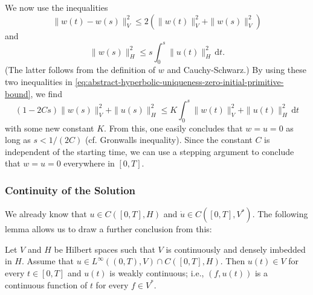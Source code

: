 We now use the inequalities
\begin{equation}\label{eq:abstract-hyperbolic-primitive-difference-triangle-bound}
\|w(t)-w(s)\|_V^2\leq2(\|w(t)\|_V^2+\|w(s)\|_V^2)
\end{equation}
and
\begin{equation}\label{eq:abstract-hyperbolic-primitive-cauchy-schwarz-bound}
\|w(s)\|_H^2\leq s\int_0^s\|u(t)\|_H^2\,\mathrm{d}t.
\end{equation}
(The latter follows from the definition of $w$ and Cauchy-Schwarz.) By using these two inequalities in \eqref{eq:abstract-hyperbolic-uniqueness-zero-initial-primitive-bound}, we find
\begin{equation}\label{eq:abstract-hyperbolic-uniqueness-stepping-gronwall-bound}
(1-2Cs)\|w(s)\|_V^2+\|u(s)\|_H^2\leq K\int_0^s\|w(t)\|_V^2+\|u(t)\|_H^2\,\mathrm{d}t
\end{equation}
with some new constant $K$. From this, one easily concludes that $w=u=0$ as long as $s<1/(2C)$ (cf. Gronwall\textquotesingle s inequality). Since the constant $C$ is independent of the starting time, we can use a stepping argument to conclude that $w=u=0$ everywhere in $[0,T]$.

\subsubsection{Continuity of the Solution}\label{subsec:hyperbolic-solution-continuity}

We already know that $u\in C([0,T],H)$ and $\dot u\in C([0,T],V^*)$. The following lemma allows us to draw a further conclusion from this:

\begin{Lemma}
\label{lem:hilbert-triple-weak-continuity}
Let $V$ and $H$ be Hilbert spaces such that $V$ is continuously and densely imbedded in $H$. Assume that $u\in L^\infty((0,T),V)\cap C([0,T],H)$. Then $u(t)\in V$ for every $t\in[0,T]$ and $u(t)$ is weakly continuous; i.e., $(f,u(t))$ is a continuous function of $t$ for every $f\in V^*$.
\end{Lemma}

